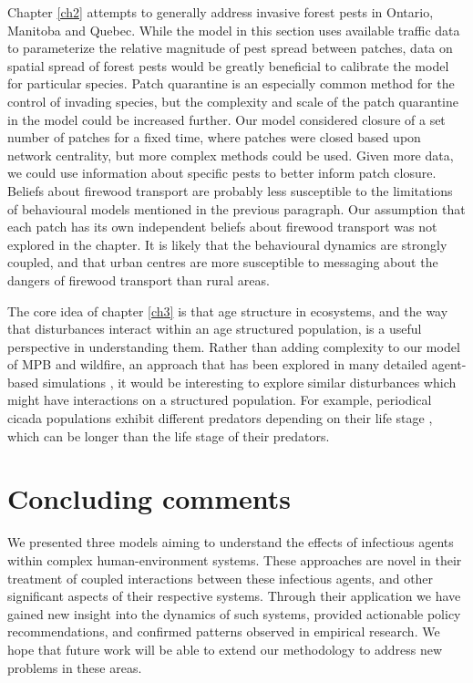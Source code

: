 Chapter \ref{ch2} attempts to generally address invasive forest pests in Ontario, Manitoba and Quebec. While the model in this section uses available traffic data to parameterize the relative magnitude of pest spread between patches, data on spatial spread of forest pests would be greatly beneficial to calibrate the model for particular species. Patch quarantine is an especially common method for the control of invading species, but the complexity and scale of the patch quarantine in the model could be increased further. Our model considered closure of a set number of patches for a fixed time, where patches were closed based upon network centrality, but more complex methods could be used. Given more data, we could use information about specific pests to better inform patch closure. Beliefs about firewood transport are probably less susceptible to the limitations  of behavioural models mentioned in the previous paragraph. Our assumption that each patch has its own independent beliefs about firewood transport was not explored in the chapter. It is likely that the behavioural dynamics are strongly coupled, and that urban centres are more susceptible to messaging about the dangers of firewood transport than rural areas. 

The core idea of chapter \ref{ch3} is that age structure in ecosystems, and the way that disturbances interact within an age structured population, is a useful perspective in understanding them. Rather than adding complexity to our model of MPB and wildfire, an approach that has been explored in many detailed agent-based simulations \cite{caldwell2013simulated,perrakis2014modeling,ager2007modeling,loehman2017interactions}, it would be interesting to explore similar disturbances which might have interactions on a structured population. For example, periodical cicada populations exhibit different predators depending on their life stage \cite{lloyd1966periodical}, which can be longer than the life stage of their predators. 

\section{Concluding comments}

We presented three models aiming to understand the effects of infectious agents within complex human-environment systems. These approaches are novel in their treatment of coupled interactions between these infectious agents, and other significant aspects of their respective systems. Through their application we have gained new insight into the dynamics of such systems, provided actionable policy recommendations, and confirmed patterns observed in empirical research. We hope that future work will be able to extend our methodology to address new problems in these areas.
